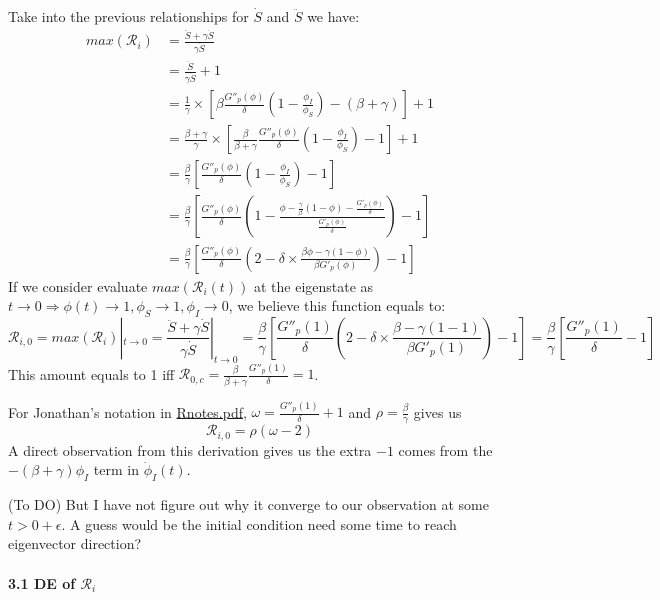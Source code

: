 \documentclass[
]{article}
\begin{document}
Take into the previous relationships for \(\dot{S}\) and \(\ddot{S}\) we
have: \[\begin{aligned}
max(\mathcal{R}_{i}) & =\frac{\ddot{S}+\gamma\dot{S}}{\gamma\dot{S}}
\\
&=\frac{\ddot{S}}{\gamma\dot{S}}+1
\\
&=\frac{1}{\gamma}\times[\beta\frac{G''_p(\phi)}{\delta}(1-\frac{\phi_I}{\phi_S})-(\beta+\gamma)]+1
\\
&=\frac{\beta+\gamma}{\gamma}\times[\frac{\beta}{\beta+\gamma}\frac{G''_p(\phi)}{\delta}(1-\frac{\phi_I}{\phi_S})-1]+1
\\
&=\frac{\beta}{\gamma}[\frac{G''_p(\phi)}{\delta}(1-\frac{\phi_I}{\phi_S})-1]
\\
&=\frac{\beta}{\gamma}[\frac{G''_p(\phi)}{\delta}(1-\frac{\phi-\frac{\gamma}{\beta}(1-\phi)-\frac{G'_p(\phi)}{\delta}}{\frac{G'_p(\phi)}{\delta}})-1]
\\
&=\frac{\beta}{\gamma}[\frac{G''_p(\phi)}{\delta}(2-\delta\times\frac{\beta\phi-\gamma(1-\phi)}{\beta G'_p(\phi)})-1]
\end{aligned}\] If we consider evaluate \(max(\mathcal{R}_i(t))\) at the
eigenstate as
\(t\rightarrow0 \Rightarrow \phi(t)\rightarrow 1, \phi_S \rightarrow 1, \phi_I \rightarrow 0\),
we believe this function equals to:
\[\mathcal{R}_{i,0}=max(\mathcal{R}_i)|_{t\rightarrow0}=\frac{\ddot{S}+\gamma\dot{S}}{\gamma\dot{S}}|_{t\rightarrow0}=\frac{\beta}{\gamma}[\frac{G''_p(1)}{\delta}(2-\delta\times\frac{\beta-\gamma(1-1)}{\beta G'_p(1)})-1]=\frac{\beta}{\gamma}[\frac{G''_p(1)}{\delta}-1]\]
This amount equals to 1 iff
\(\mathcal{R}_{0,c}=\frac{\beta}{\beta+\gamma}\frac{G''_p(1)}{\delta}=1\).

For Jonathan's notation in \href{./outputs/Rnotes.pdf}{Rnotes.pdf},
\(\omega=\frac{G''_p(1)}{\delta}+1\) and \(\rho=\frac{\beta}{\gamma}\)
gives us \[\mathcal{R}_{i,0}=\rho(\omega-2)\] A direct observation from
this derivation gives us the extra \(-1\) comes from the
\(-(\beta+\gamma)\phi_I\) term in \(\dot{\phi}_I(t)\).

(To DO) But I have not figure out why it converge to our observation at
some \(t>0+\epsilon\). A guess would be the initial condition need some
time to reach eigenvector direction?

\paragraph{\texorpdfstring{3.1 DE of
\(\mathcal{R}_i\)}{3.1 DE of \textbackslash mathcal\{R\}\_i}}\label{de-of-mathcalr_i}
\end{document}
